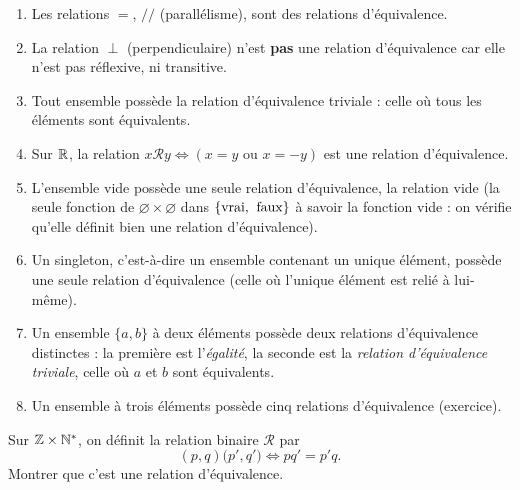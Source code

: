 \begin{exemples}
\begin{enumerate}[label=\alph*)]
\item Les relations $=$, $//$ (parallélisme), sont des relations d'équivalence.
\item La relation $\perp$ (perpendiculaire) n'est \textbf{pas} une relation d'équivalence car elle n'est pas réflexive, ni transitive.
\item Tout ensemble possède la relation d'équivalence triviale : celle où tous les éléments sont équivalents.
\item Sur $\mathbb{R}$, la relation $x\mathcal R y \iff \left(x=y\text{ ou }x=-y\right)$ est une relation d'équivalence.
\item L'ensemble vide possède une seule relation d'équivalence, la relation vide (la seule fonction de $\varnothing \times \varnothing$ dans $\{\text{vrai,\: faux}\}$ à savoir la fonction vide : on vérifie qu'elle définit bien une relation d'équivalence).
\item Un singleton, c'est-à-dire un ensemble contenant un unique élément, possède une seule relation d'équivalence (celle où l'unique élément est relié à lui-même).
\item Un ensemble $\{a,b\}$ à deux éléments possède deux relations d'équivalence distinctes : la première est l'\emph{égalité}, la seconde est la \emph{relation d'équivalence triviale}, celle où $a$ et $b$ sont équivalents.
\item Un ensemble à trois éléments possède cinq relations d'équivalence (exercice).
\end{enumerate}
\end{exemples}

\begin{exercice}
Sur $\mathbb{Z}\times \mathbb{N}^*$, on définit la relation binaire $\mathcal R$ par
\[(p,q)\mathcal (p',q') \iff pq'=p'q.\]
Montrer que c'est une relation d'équivalence.
\end{exercice}

